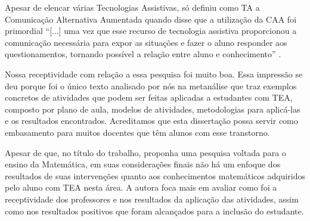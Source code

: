 \documentclass[portuguese]{textolivre}
\begin{document}
Apesar de elencar várias Tecnologias Assistivas, \textcite{camargo2020} só
definiu como TA a Comunicação Alternativa Aumentada quando disse que a
utilização da CAA foi primordial ``{[}...{]} uma vez que esse recurso de
tecnologia assistiva proporcionou a comunicação necessária para expor as
situações e fazer o aluno responder aos questionamentos, tornando
possível a relação entre aluno e conhecimento''
\cite[p.~80]{camargo2020}.

Nossa receptividade com relação a essa pesquisa foi muito boa. Essa
impressão se deu porque foi o único texto analisado por nós na
metanálise que traz exemplos concretos de atividades que podem ser
feitas aplicadas a estudantes com TEA, composto por plano de aula,
modelos de atividades, metodologias para aplicá-las e os resultados
encontrados. Acreditamos que esta dissertação possa servir como
embasamento para muitos docentes que têm alunos com esse transtorno.

Apesar de que, no título do trabalho, \textcite{camargo2020} proponha uma
pesquisa voltada para o ensino da Matemática, em suas considerações
finais não há um enfoque dos resultados de suas intervenções quanto aos
conhecimentos matemáticos adquiridos pelo aluno com TEA nesta área. A
autora foca mais em avaliar como foi a receptividade dos professores e
nos resultados da aplicação das atividades, assim como nos resultados
positivos que foram alcançados para a inclusão do estudante.
\end{document}

